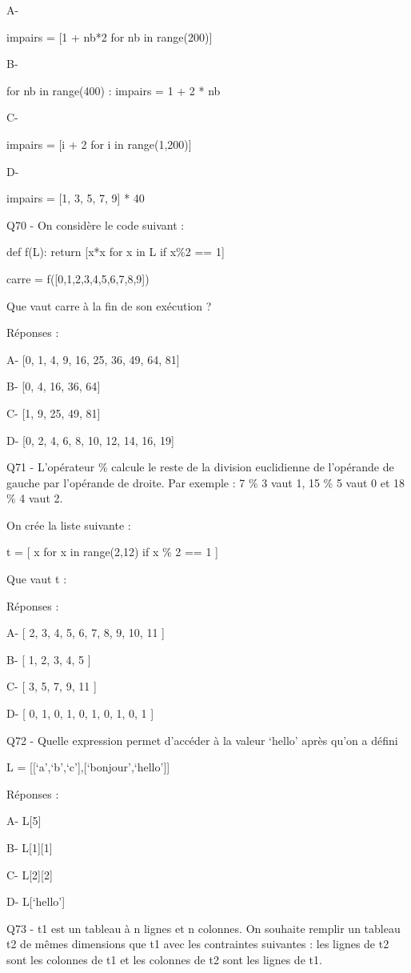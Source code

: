 \documentclass[
]{book}
\begin{document}
A-

impairs = {[}1 + nb*2 for nb in range(200){]}

B-

for nb in range(400) :
impairs = 1 + 2 * nb

C-

impairs = {[}i + 2 for i in range(1,200){]}

D-

impairs = {[}1, 3, 5, 7, 9{]} * 40

Q70 - On considère le code suivant :

def f(L):
return {[}x*x for x in L if x\%2 == 1{]}

carre = f({[}0,1,2,3,4,5,6,7,8,9{]})

Que vaut carre à la fin de son exécution ?

Réponses :

A- {[}0, 1, 4, 9, 16, 25, 36, 49, 64, 81{]}

B- {[}0, 4, 16, 36, 64{]}

C- {[}1, 9, 25, 49, 81{]}

D- {[}0, 2, 4, 6, 8, 10, 12, 14, 16, 19{]}

Q71 - L'opérateur \% calcule le reste de la division euclidienne de l'opérande de gauche par l'opérande de droite. Par exemple : 7 \% 3 vaut 1, 15 \% 5 vaut 0 et 18 \% 4 vaut 2.

On crée la liste suivante :

t = {[} x for x in range(2,12) if x \% 2 == 1 {]}

Que vaut t :

Réponses :

A- {[} 2, 3, 4, 5, 6, 7, 8, 9, 10, 11 {]}

B- {[} 1, 2, 3, 4, 5 {]}

C- {[} 3, 5, 7, 9, 11 {]}

D- {[} 0, 1, 0, 1, 0, 1, 0, 1, 0, 1 {]}

Q72 - Quelle expression permet d'accéder à la valeur `hello' après qu'on a défini

L = {[}{[}`a',`b',`c'{]},{[}`bonjour',`hello'{]}{]}

Réponses :

A- L{[}5{]}

B- L{[}1{]}{[}1{]}

C- L{[}2{]}{[}2{]}

D- L{[}`hello'{]}

Q73 - t1 est un tableau à n lignes et n colonnes. On souhaite remplir un tableau t2 de mêmes dimensions que t1 avec les contraintes suivantes : les lignes de t2 sont les colonnes de t1 et les colonnes de t2 sont les lignes de t1.
\end{document}
